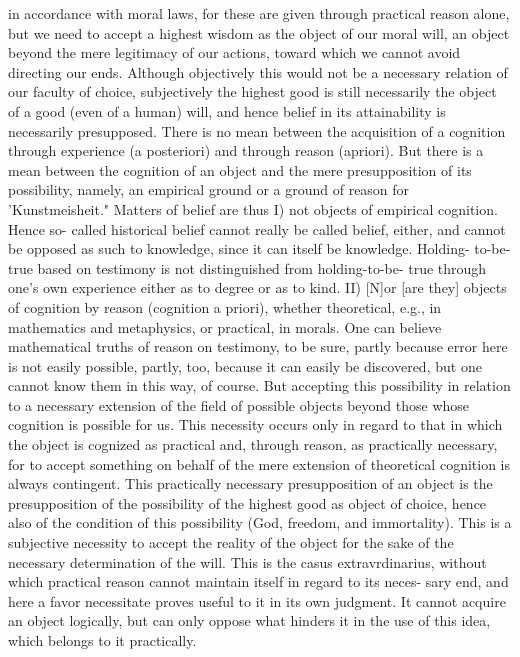 in accordance with moral laws, for these are given through practical reason alone, but we
need to accept a highest wisdom as the object of our moral will, an object beyond the mere
legitimacy of our actions, toward which we cannot avoid directing our ends. Although
objectively this would not be a necessary relation of our faculty of choice, subjectively the
highest good is still necessarily the object of a good (even of a human) will, and hence belief
in its attainability is necessarily presupposed.
There is no mean between the acquisition of a cognition through experience (a posteriori)
and through reason (apriori). But there is a mean between the cognition of an object and the
mere presupposition of its possibility, namely, an empirical ground or a ground of reason for
'Kunstmeisheit."
Matters of belief are thus I) not objects of empirical cognition. Hence so-
called historical belief cannot really be called belief, either, and cannot be
opposed as such to knowledge, since it can itself be knowledge. Holding-
to-be-true based on testimony is not distinguished from holding-to-be-
true through one's own experience either as to degree or as to kind.
II) [N]or [are they] objects of cognition by reason (cognition a priori),
whether theoretical, e.g., in mathematics and metaphysics, or practical, in
morals.
One can believe mathematical truths of reason on testimony, to be sure,
partly because error here is not easily possible, partly, too, because it can
easily be discovered, but one cannot know them in this way, of course. But
accepting this possibility in relation to a necessary extension of the field of possible objects
beyond those whose cognition is possible for us. This necessity occurs only in regard to that
in which the object is cognized as practical and, through reason, as practically necessary, for
to accept something on behalf of the mere extension of theoretical cognition is always
contingent. This practically necessary presupposition of an object is the presupposition of the
possibility of the highest good as object of choice, hence also of the condition of this
possibility (God, freedom, and immortality). This is a subjective necessity to accept the
reality of the object for the sake of the necessary determination of the will. This is the casus
extravrdinarius, without which practical reason cannot maintain itself in regard to its neces-
sary end, and here a favor necessitate proves useful to it in its own judgment. It cannot acquire
an object logically, but can only oppose what hinders it in the use of this idea, which belongs
to it practically.
